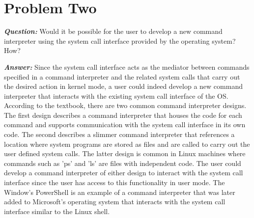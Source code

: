 \documentclass[letterpaper, 10pt,DIV=13]{scrartcl}
\numberwithin{equation}{section} %
\numberwithin{figure}{section} %
\numberwithin{table}{section} %
\begin{document}
\section{Problem Two}

\textbf{\emph{Question:}}
Would it be possible for the user to develop a new command interpreter using the system call interface provided by the operating system? How?

\textbf{\emph{Answer:}}
Since the system call interface acts as the mediator between commands specified in a command interpreter and the related system calls that carry out the desired action in kernel mode, a user could indeed develop a new command interpreter that interacts with the existing system call interface of the OS. According to the textbook, there are two common command interpreter designs. The first design describes a command interpreter that houses the code for each command and supports communication with the system call interface in its own code. The second describes a slimmer command interpreter that references a location where system programs are stored as files and are called to carry out the user defined system calls\cite{concepts}. The latter design is common in Linux machines where commands such as 'ps' and 'ls' are files with independent code. The user could develop a command interpreter of either design to interact with the system call interface since the user has access to this functionality in user mode. The Window's PowerShell is an example of a command interpreter that was later added to Microsoft's operating system that interacts with the system call interface similar to the Linux shell. 




 
\end{document}
